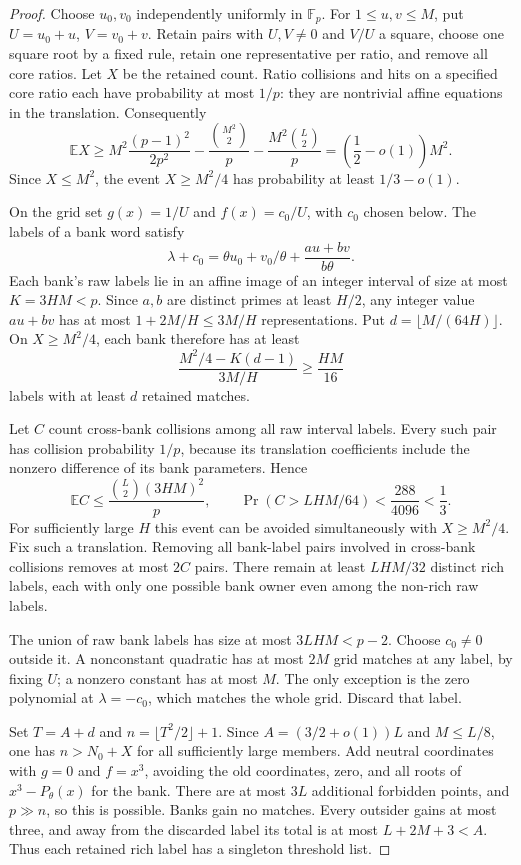 \begin{proof}
Choose $u_0,v_0$ independently uniformly in $\mathbb F_p$.
For $1\le u,v\le M$, put $U=u_0+u$, $V=v_0+v$.
Retain pairs with $U,V\ne0$ and $V/U$ a square, choose one square
root by a fixed rule, retain one representative per ratio, and remove
all core ratios.  Let $X$ be the retained count.  Ratio collisions
and hits on a specified core ratio each have probability at most $1/p$:
they are nontrivial affine equations in the translation.  Consequently
\[
 \mathbb E X\ge M^2\frac{(p-1)^2}{2p^2}
 -\frac{\binom{M^2}{2}}p-\frac{M^2\binom L2}p
 =\left(\frac12-o(1)\right)M^2.
\]
Since $X\le M^2$, the event $X\ge M^2/4$ has probability at least
$1/3-o(1)$.

On the grid set $g(x)=1/U$ and $f(x)=c_0/U$, with $c_0$ chosen below.
The labels of a bank word satisfy
\[
 \lambda+c_0=\theta u_0+v_0/\theta
                 +\frac{au+bv}{b\theta}.
\]
Each bank's raw labels lie in an affine image of an integer interval
of size at most $K=3HM<p$.  Since $a,b$ are distinct primes at least
$H/2$, any integer value $au+bv$ has at most $1+2M/H\le3M/H$
representations.  Put $d=\lfloor M/(64H)\rfloor$.  On $X\ge M^2/4$,
each bank therefore has at least
\[
 \frac{M^2/4-K(d-1)}{3M/H}\ge\frac{HM}{16}
\]
labels with at least $d$ retained matches.

Let $C$ count cross-bank collisions among all raw interval labels.
Every such pair has collision probability $1/p$, because its
translation coefficients include the nonzero difference of its bank
parameters.  Hence
\[
 \mathbb E C\le\frac{\binom L2(3HM)^2}{p},\qquad
 \Pr(C>LHM/64)<\frac{288}{4096}<\frac13.
\]
For sufficiently large $H$ this event can be avoided simultaneously
with $X\ge M^2/4$.  Fix such a translation.  Removing all bank-label
pairs involved in cross-bank collisions removes at most $2C$ pairs.
There remain at least $LHM/32$ distinct rich labels, each with only
one possible bank owner even among the non-rich raw labels.

The union of raw bank labels has size at most $3LHM<p-2$.
Choose $c_0\ne0$ outside it.  A nonconstant quadratic has at most
$2M$ grid matches at any label, by fixing $U$; a nonzero constant has
at most $M$.  The only exception is the zero polynomial at
$\lambda=-c_0$, which matches the whole grid.  Discard that label.

Set $T=A+d$ and $n=\lfloor T^2/2\rfloor+1$.
Since $A=(3/2+o(1))L$ and $M\le L/8$, one has
$n>N_0+X$ for all sufficiently large members.  Add neutral coordinates
with $g=0$ and $f=x^3$, avoiding the old coordinates, zero, and all
roots of $x^3-P_\theta(x)$ for the bank.  There are at most $3L$
additional forbidden points, and $p\gg n$, so this is possible.
Banks gain no matches.  Every outsider gains at most three, and away
from the discarded label its total is at most $L+2M+3<A$.
Thus each retained rich label has a singleton threshold list.


\end{proof}
